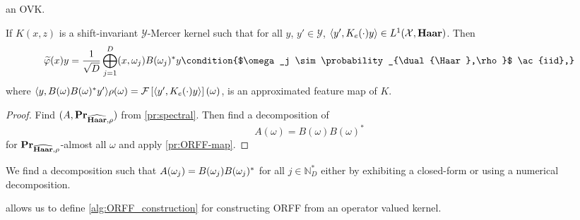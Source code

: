 an \acs{OVK}.
\begin{corollary}
    \label{cr:ORFF-map-kernel} If $K(x,z)$ is a shift-invariant
    $\mathcal{Y}$-Mercer kernel such that for all $y$, $y'\in\mathcal{Y}$,
    $\langle y', K_e(\cdot)y\rangle\in L^1(\mathcal{X},\mathbf{Haar})$. Then
    \begin{dmath*}
        \tildePhi{\omega}(x)y
        = \frac{1}{\sqrt{D}}\Vect_{j=1}^D\pairing{x,
        \omega_j}B(\omega_j)^\adjoint y \condition{$\omega_j \sim
        \probability_{\dual{\Haar},\rho}$ \ac{iid},}
    \end{dmath*}
    where $\langle y, B(\omega)B(\omega)^* y'\rangle\rho(\omega)=\mathcal{F}\left[\langle y',
    K_e(\cdot)y\rangle\right](\omega)$, is an approximated feature map of $K$.
\end{corollary}
\begin{proof}
    Find $(A, {\mathbf{{Pr}}}_{\widehat{\mathbf{Haar}},\rho})$ from \cref{pr:spectral}. Then
    find a decomposition of
    \begin{dmath*}
        A(\omega)=B(\omega)B(\omega)^*
    \end{dmath*}
    for ${\mathbf{{Pr}}}_{\widehat{\mathbf{Haar}},\rho}$-almost all $\omega$ and apply
    \cref{pr:ORFF-map}.
\end{proof}
\begin{remark}
    We find a decomposition such that
    $A(\omega_j)=B(\omega_j)B(\omega_j)^* $ for all $j\in\mathbb{N}^*_D$
    either by exhibiting a closed-form or using a numerical decomposition.
\end{remark}
 allows us to define \cref{alg:ORFF_construction} for
constructing \acs{ORFF} from an operator valued kernel.
